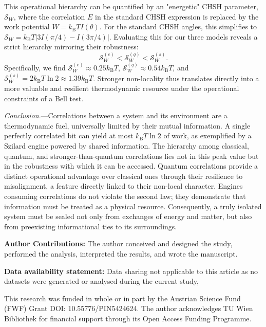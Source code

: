 \documentclass[%
  reprint,
  showpacs,
  showkeys,
  prl,
  floatfix
]{revtex4-2}
\begin{document}
This operational hierarchy can be quantified by an "energetic" CHSH parameter, $\mathcal{S}_W$, where the correlation $E$ in the standard CHSH expression is replaced by the work potential $W = k_{\mathrm{B}}T I(\theta)$. For the standard CHSH angles, this simplifies to $\mathcal{S}_W = k_{\mathrm{B}}T |3I(\pi/4) - I(3\pi/4)|$. Evaluating this for our three models reveals a strict hierarchy mirroring their robustness:
\begin{equation}
\mathcal{S}_W^{(c)} < \mathcal{S}_W^{(q)} < \mathcal{S}_W^{(s)}.
\end{equation}
Specifically, we find $\mathcal{S}_W^{(c)} \approx 0.25 k_{\mathrm{B}}T$, $\mathcal{S}_W^{(q)} \approx 0.54 k_{\mathrm{B}}T$, and $\mathcal{S}_W^{(s)} = 2 k_{\mathrm{B}}T \ln 2 \approx 1.39 k_{\mathrm{B}}T$. Stronger non-locality thus translates directly into a more valuable and resilient thermodynamic resource under the operational constraints of a Bell test.

\textit{Conclusion}.---Correlations between a system and its environment are a thermodynamic fuel, universally limited by their mutual information. A single perfectly correlated bit can yield at most $k_{\mathrm{B}}T\ln 2$ of work, as exemplified by a Szilard engine powered by shared information. The hierarchy among classical, quantum, and stronger-than-quantum correlations lies not in this peak value but in the robustness with which it can be accessed. Quantum correlations provide a distinct operational advantage over classical ones through their resilience to misalignment, a feature directly linked to their non-local character. Engines consuming correlations do not violate the second law; they demonstrate that information must be treated as a physical resource. Consequently, a truly isolated system must be sealed not only from exchanges of energy and matter, but also from preexisting informational ties to its surroundings.


\textbf{Author Contributions:} The author conceived and designed the study, performed the analysis, interpreted the results, and wrote the manuscript.

\textbf{Data availability statement:} Data sharing not applicable to this article as no datasets were generated or analysed during the current study,

\begin{acknowledgments}
This research was funded in whole or in part by the Austrian Science Fund (FWF) Grant DOI: 10.55776/PIN5424624. The author acknowledges TU Wien Bibliothek for financial support through its Open Access Funding Programme.
\end{acknowledgments}


\end{document}
